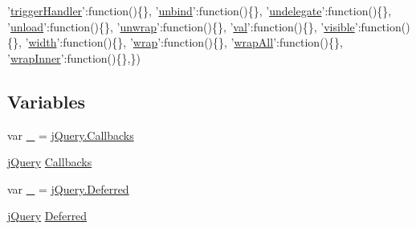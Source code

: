 \begin{DoxyCompactItemize}
'\hyperlink{jquery-1_810_82-vsdoc_8js_afe18935b86e978c91a4ae291ad8825c8}{trigger\-Handler}'\-:function()\{\}, '\hyperlink{jquery-1_810_82-vsdoc_8js_af46ad9e68add9abd540e1b4f9da37b62}{unbind}'\-:function()\{\}, '\hyperlink{jquery-1_810_82-vsdoc_8js_adf3212944c5742602d54b599a05f0746}{undelegate}'\-:function()\{\}, '\hyperlink{jquery-1_810_82-vsdoc_8js_ae048eb914220ef1a45b8cef8fbf97041}{unload}'\-:function()\{\}, '\hyperlink{jquery-1_810_82-vsdoc_8js_a3916788ca00ed5d623ae18b843eb1bda}{unwrap}'\-:function()\{\}, '\hyperlink{jquery-1_810_82-vsdoc_8js_a0888cacd53defa08fbb4972d54ece4b0}{val}'\-:function()\{\}, '\hyperlink{jquery-1_810_82_8min_8js_a52992524aa1f4d01d5c9f1b9a15c35f5}{visible}'\-:function()\{\}, '\hyperlink{jquery-1_810_82-vsdoc_8js_ac02818d8d1572403600aa377a993fc3e}{width}'\-:function()\{\}, '\hyperlink{jquery-1_810_82-vsdoc_8js_a75991b1c3d71522ced1bf65ab3b07902}{wrap}'\-:function()\{\}, '\hyperlink{jquery-1_810_82-vsdoc_8js_a2c353bb2917de8da2978e4b4dd73acb3}{wrap\-All}'\-:function()\{\}, '\hyperlink{jquery-1_810_82-vsdoc_8js_a41a3e550d6fe55baac11c61ed710ec2a}{wrap\-Inner}'\-:function()\{\},\})
\end{DoxyCompactItemize}
\subsection*{Variables}
\begin{DoxyCompactItemize}
\item 
var \hyperlink{jquery-1_810_82_8intellisense_8js_af58a9af35e2376001e3219aef7e0bda3}{\-\_} = \hyperlink{jquery-1_810_82_8intellisense_8js_add8d59d25831bb9b171fdbee8a18795b}{j\-Query.\-Callbacks}
\item 
\hyperlink{jquery-1_810_82_8js_a5e01048fbd3a30b44e8d491d8945c457}{j\-Query} \hyperlink{jquery-1_810_82_8intellisense_8js_add8d59d25831bb9b171fdbee8a18795b}{Callbacks}
\item 
var \hyperlink{jquery-1_810_82_8intellisense_8js_a2378dbe13bea17e176a553e3f262f342}{\-\_} = \hyperlink{jquery-1_810_82_8intellisense_8js_ab355ffd82371d88c17da7c1dae9e8829}{j\-Query.\-Deferred}
\item 
\hyperlink{jquery-1_810_82_8js_a5e01048fbd3a30b44e8d491d8945c457}{j\-Query} \hyperlink{jquery-1_810_82_8intellisense_8js_ab355ffd82371d88c17da7c1dae9e8829}{Deferred}
\end{DoxyCompactItemize}


